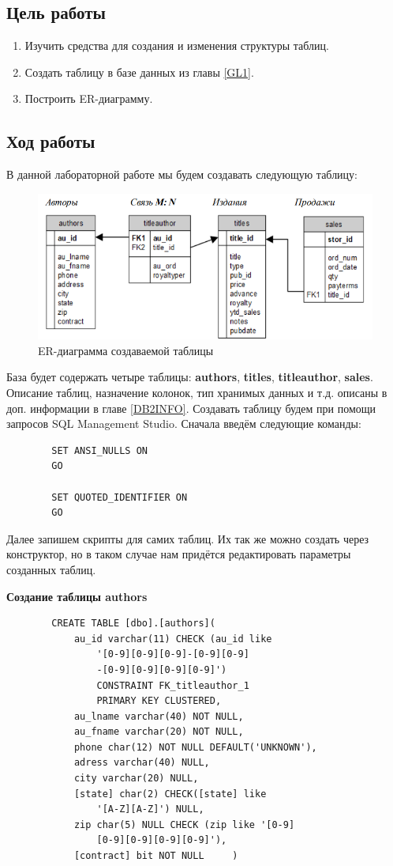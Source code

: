 \subsection{Цель работы}
\begin{enumerate}
    \item Изучить средства для создания и изменения структуры таблиц.
    \item Создать таблицу в базе данных из главы \ref{GL1}.
    \item Построить ER-диаграмму.
\end{enumerate}

\subsection{Ход работы}

В данной лабораторной работе мы будем создавать следующую таблицу:
\begin{figure}[h!]
    \centering
    \includegraphics[width=0.5\linewidth]{Pic/lab2/Table.PNG}
    \caption{ER-диаграмма создаваемой таблицы}
    \label{fig:enter-label}
\end{figure}

База будет содержать четыре таблицы: \textbf{authors},   \textbf{titles}, \textbf{titleauthor}, \textbf{sales}. Описание таблиц, назначение колонок, тип хранимых данных и т.д. описаны в доп. информации в главе \ref{DB2INFO}. Создавать таблицу будем при помощи запросов SQL Management Studio. Сначала введём следующие команды:
\begin{verbatim}
        SET ANSI_NULLS ON
        GO

        SET QUOTED_IDENTIFIER ON
        GO
\end{verbatim}

Далее запишем скрипты для самих таблиц. Их так же можно создать через конструктор, но в таком случае нам придётся редактировать параметры созданных таблиц.

\textbf{Создание таблицы authors}
\begin{verbatim}
        CREATE TABLE [dbo].[authors](
            au_id varchar(11) CHECK (au_id like
                '[0-9][0-9][0-9]-[0-9][0-9]
                -[0-9][0-9][0-9][0-9]') 
                CONSTRAINT FK_titleauthor_1 
                PRIMARY KEY CLUSTERED,
            au_lname varchar(40) NOT NULL,
            au_fname varchar(20) NOT NULL,
            phone char(12) NOT NULL DEFAULT('UNKNOWN'),
            adress varchar(40) NULL,
            city varchar(20) NULL,
            [state] char(2) CHECK([state] like 
                '[A-Z][A-Z]') NULL,
            zip char(5) NULL CHECK (zip like '[0-9]
                [0-9][0-9][0-9][0-9]'),
            [contract] bit NOT NULL		)
\end{verbatim}
\newpage

